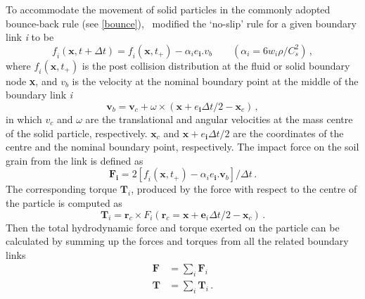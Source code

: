 To accommodate the movement of solid particles in the commonly adopted 
bounce-back rule (see \cref{bounce}),~\citet{Ladd1994} modified the `no-slip' 
rule for a given boundary link \textit{i} to be
%
\begin{equation}
\mathit{f_i}(\mathbf{x}, t + \Delta t)=\mathit{f_i}(\mathbf{x}, t_{+}) - 
\alpha_{\mathit{i}}\mathbf{\mathit{e}_i}.\mathbf{\mathit{v}}_{b} \qquad 
(\alpha_{i}=6\mathit{w_i}\rho/\mathit{C}_{\mathit{s}}^{2})\,,
\end{equation}
%
\noindent where $\mathit{f_i}(\mathbf{x}, t_{+})$ is the post collision 
distribution at the fluid or solid boundary node \textbf{x}, and 
$\mathit{v}_{b}$ is the velocity at the nominal boundary point at the middle of 
the boundary link \textit{i}
%
\begin{equation}
\mathbf{v}_{b}=\mathbf{v}_{c}+\omega \times 
(\mathbf{x}+\mathbf{\mathit{e}_i}\Delta t /2 - \mathbf{x}_{c})\,,
\end{equation}
%
\noindent in which $\mathbf{\mathit{v}}_{c}$ and $\omega$ are the translational 
and angular velocities at the mass centre of the solid particle, respectively. 
$\mathbf{x}_{c}$ and $\mathbf{x}+\mathbf{\mathit{e}_i}\Delta t /2$ are the 
coordinates of the centre and the nominal boundary point,  respectively. The 
impact force on the soil grain from the link is defined as
%
\begin{equation}
\mathbf{F_i}=2[\mathit{f_i} (\mathbf{x}, t_{+}) 
-\alpha_{\mathit{i}}\mathbf{\mathit{e}_i}.\mathbf{v}_{b}]/ \Delta t \,.
\end{equation} 
%
The corresponding torque $\mathbf{T}_{\mathit{i}}$, produced by the force with 
respect to the centre of the particle is computed as
%
\begin{equation}
\mathbf{T}_{\mathit{i}}=\mathbf{r}_{c} \times \mathit{F_i} 
(\mathbf{r}_{c}=\mathbf{x}+\mathbf{e}_{\mathit{i}} \Delta t /2 - \mathbf{x}_{c})
\,.
\end{equation}
%
Then the total hydrodynamic force and torque exerted on the particle can be 
calculated by summing up the forces and torques from all the related boundary 
links
%
\begin{equation}
\begin{aligned}
\mathbf{F} &= \sum\limits_{\mathit{i}}{\mathbf{F}_{\mathit{i}}} \\
\mathbf{T} &= \sum\limits_{\mathit{i}}{\mathbf{T}_{\mathit{i}}} \,.
\end{aligned}
\end{equation}


